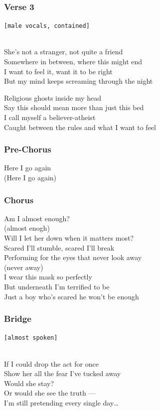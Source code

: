 \subsubsection{Verse 3}\label{verse-3-17}

\texttt{{[}male\ vocals,\ contained{]}}\strut \\
She's not a stranger, not quite a friend\\
Somewhere in between, where this might end\\
I want to feel it, want it to be right\\
But my mind keeps screaming through the night

Religious ghosts inside my head\\
Say this should mean more than just this bed\\
I call myself a believer-atheist\\
Caught between the rules and what I want to feel

\subsubsection{Pre-Chorus}\label{pre-chorus-58}

Here I go again\\
(Here I go again)

\subsubsection{Chorus}\label{chorus-75}

Am I almost enough?\\
(almost enogh)\\
Will I let her down when it matters most?\\
Scared I'll stumble, scared I'll break\\
Performing for the eyes that never look away\\
(never away)\\
I wear this mask so perfectly\\
But underneath I'm terrified to be\\
Just a boy who's scared he won't be enough

\subsubsection{Bridge}\label{bridge-24}

\texttt{{[}almost\ spoken{]}}\strut \\
If I could drop the act for once\\
Show her all the fear I've tucked away\\
Would she stay?\\
Or would she see the truth ---\\
I'm still pretending every single day\ldots{}

